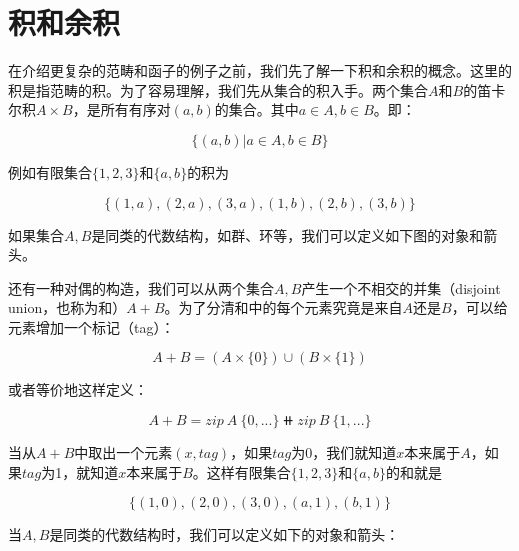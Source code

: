 \documentclass{article}
\begin{document}
\section{积和余积}

在介绍更复杂的范畴和函子的例子之前，我们先了解一下积和余积的概念。这里的积是指范畴的积。为了容易理解，我们先从集合的积入手。两个集合$A$和$B$的笛卡尔积$A \times B$，是所有有序对$(a, b)$的集合。其中$a \in A, b \in B$。即：

\[
\{(a, b) | a \in A, b \in B\}
\]

例如有限集合$\{1, 2, 3\}$和$\{a, b\}$的积为

\[
\{(1, a), (2, a), (3, a), (1, b), (2, b), (3, b)\}
\]

如果集合$A, B$是同类的代数结构，如群、环等，我们可以定义如下图的对象和箭头。

\begin{center}
\end{center}

还有一种对偶的构造，我们可以从两个集合$A, B$产生一个不相交的并集（disjoint union，也称为和）$A + B$。为了分清和中的每个元素究竟是来自$A$还是$B$，可以给元素增加一个标记（tag）：

\[
A + B = (A \times \{0\}) \cup (B \times \{1\})
\]

或者等价地这样定义：

\[
A + B = zip\ A\ \{0, ...\} \doubleplus zip\ B\ \{1, ...\}
\]

当从$A+B$中取出一个元素$(x, tag)$，如果$tag$为0，我们就知道$x$本来属于$A$，如果$tag$为1，就知道$x$本来属于$B$。这样有限集合$\{1, 2, 3\}$和$\{a, b\}$的和就是

\[
\{(1, 0), (2, 0), (3, 0), (a, 1), (b, 1)\}
\]

当$A, B$是同类的代数结构时，我们可以定义如下的对象和箭头：

\begin{center}
\end{center}
\end{document}
